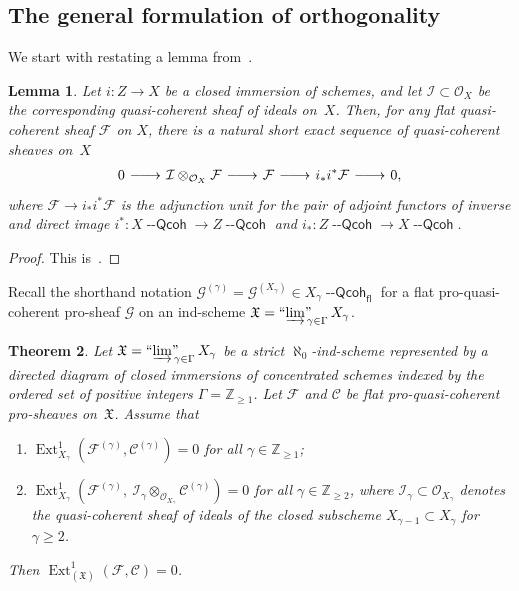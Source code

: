 \documentclass[12pt,a4paper]{amsart}
\newcommand{\+}{\protect\nobreakdash-}
\renewcommand{\:}{\colon}
\newcommand{\rarrow}{\longrightarrow}
\newcommand{\ot}{\otimes}
\newcommand{\lrarrow}{\mskip.5\thinmuskip\relbar\joinrel\relbar\joinrel
 \rightarrow\mskip.5\thinmuskip\relax}
\DeclareMathOperator{\Ext}{Ext}
\newcommand{\Qcoh}{{\operatorname{\mathsf{--Qcoh}}}}
\newcommand{\fl}{\mathsf{fl}}
\newcommand{\ilim}
 {\mathop{\text{\normalfont``$\varinjlim$''\!\!}}\nolimits}
\newcommand{\cO}{\mathcal O}
\newcommand{\cI}{\mathcal I}
\newcommand{\cF}{\mathcal F}
\newcommand{\fX}{\mathfrak X}
\newcommand{\rC}{\mathscr C}
\newcommand{\rF}{\mathscr F}
\newcommand{\rG}{\mathscr G}
\newcommand{\boZ}{\mathbb Z}
\theoremstyle{plain}
\newtheorem{thm}{Theorem}[section]
\newtheorem{lem}[thm]{Lemma}
\theoremstyle{definition}
\begin{document}
\subsection{The general formulation of orthogonality}
 We start with restating a lemma from~\cite[Section~8.5]{Pform}.

\begin{lem} \label{tensor-with-sheaf-of-ideals-adjunction-sequence}
 Let $i\:Z\rarrow X$ be a closed immersion of schemes, and let\/
$\cI\subset\cO_X$ be the corresponding quasi-coherent sheaf of
ideals on~$X$.
 Then, for any flat quasi-coherent sheaf\/ $\cF$ on $X$, there is
a natural short exact sequence of quasi-coherent sheaves on~$X$
$$
 0\lrarrow\cI\ot_{\cO_X}\cF\lrarrow\cF\lrarrow i_*i^*\cF\lrarrow0,
$$
where $\cF\rarrow i_*i^*\cF$ is the adjunction unit for
the pair of adjoint functors of inverse and direct image
$i^*\:X\Qcoh\rarrow Z\Qcoh$ and $i_*\:Z\Qcoh\rarrow X\Qcoh$.
\end{lem}

\begin{proof}
 This is~\cite[Lemma~8.5.5]{Pform}.
\end{proof}

 Recall the shorthand notation $\rG^{(\gamma)}=\rG^{(X_\gamma)}\in
X_\gamma\Qcoh_\fl$ for a flat pro-quasi-coherent pro-sheaf $\rG$
on an ind-scheme $\fX=\ilim_{\gamma\in\Gamma}X_\gamma$.

\begin{thm} \label{flat-proqcoh-prosheaves-Ext1-orthogonality-thm}
 Let\/ $\fX=\ilim_{\gamma\in\Gamma}X_\gamma$ be a strict\/
$\aleph_0$\+ind-scheme represented by a directed diagram of closed
immersions of concentrated schemes indexed by the ordered set of
positive integers\/ $\Gamma=\boZ_{\ge1}$.
 Let\/ $\rF$ and\/ $\rC$ be flat pro-quasi-coherent pro-sheaves
on\/~$\fX$.
 Assume that
\begin{enumerate}
\renewcommand{\theenumi}{\roman{enumi}}
\item $\Ext^1_{X_\gamma}(\rF^{(\gamma)},\rC^{(\gamma)})=0$
for all\/ $\gamma\in\boZ_{\ge1}$;
\item $\Ext^1_{X_\gamma}(\rF^{(\gamma)},\>
\cI_\gamma\ot_{\cO_{X_\gamma}}\rC^{(\gamma)})=0$
for all\/ $\gamma\in\boZ_{\ge2}$, where\/
$\cI_{\gamma}\subset\cO_{X_\gamma}$ denotes the quasi-coherent sheaf
of ideals of the closed subscheme $X_{\gamma-1}\subset X_\gamma$
for\/ $\gamma\ge2$.
\end{enumerate}
 Then\/ $\Ext^1_{(\fX)}(\rF,\rC)=0$.
\end{thm}
\end{document}
